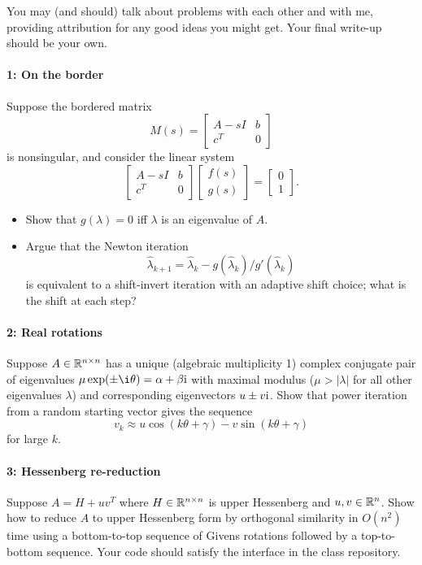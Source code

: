 \documentclass[12pt, leqno]{article} %
\begin{document}

You may (and should) talk about problems with each other and with me,
providing attribution for any good ideas you might get.  Your final
write-up should be your own.


\paragraph*{1: On the border}
Suppose the bordered matrix
\[
  M(s) =
  \begin{bmatrix}
    A-s I & b \\
    c^T & 0
  \end{bmatrix}
\]
is nonsingular, and consider the linear system
\[
  \begin{bmatrix} A-s I & b \\ c^T & 0 \end{bmatrix}
  \begin{bmatrix} f(s) \\ g(s) \end{bmatrix} =
  \begin{bmatrix} 0 \\ 1 \end{bmatrix}.
\]
\begin{itemize}
\item
  Show that $g(\lambda) = 0$ iff $\lambda$ is an eigenvalue of $A$.
\item
  Argue that the Newton iteration
  \[
  \hat{\lambda}_{k+1} = \hat{\lambda}_k - g(\hat{\lambda}_k)/g'(\hat{\lambda}_k)
  \]
  is equivalent to a shift-invert iteration with an adaptive shift
  choice; what is the shift at each step?
\end{itemize}

\paragraph*{2: Real rotations}
Suppose $A \in \mathbb{R}^{n \times n}$ has a unique (algebraic multiplicity 1)
complex conjugate pair of eigenvalues $\mu \exp(\pm \i\theta) = \alpha + \beta \iu$ with maximal
modulus ($\mu > |\lambda|$ for all other eigenvalues $\lambda$) and
corresponding eigenvectors $u \pm v \mathrm{i}$.  Show that power iteration
from a random starting vector gives the sequence
\[
  v_k \approx u \cos(k\theta + \gamma) - v \sin(k\theta+\gamma)
\]
for large $k$.

\paragraph*{3: Hessenberg re-reduction}
Suppose $A = H + uv^T$ where $H \in \mathbb{R}^{n \times n}$ is upper
Hessenberg and $u, v \in \mathbb{R}^n$.  Show how to reduce $A$ to upper
Hessenberg form by orthogonal similarity in $O(n^2)$ time using a
bottom-to-top sequence of Givens rotations followed by a top-to-bottom
sequence.  Your code should satisfy the interface in the class repository.
\end{document}
